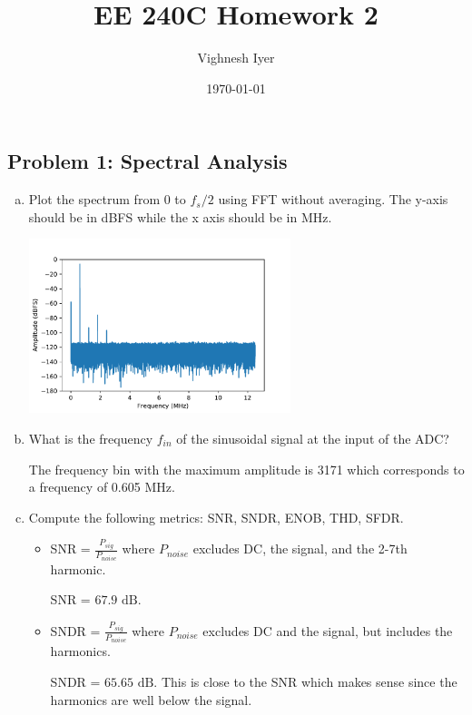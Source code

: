 \documentclass[11pt]{article}
\begin{document}
\title{EE 240C Homework 2}
\author{Vighnesh Iyer}
\date{\today}
\maketitle

\subsection*{Problem 1: Spectral Analysis}
\begin{enumerate}[a)]
    \item Plot the spectrum from 0 to $f_s/2$ using FFT without averaging. The y-axis should be in dBFS while the x axis should be in MHz.

      \begin{center}
        \includegraphics[width=0.6\textwidth]{figs/problem1a.pdf}
      \end{center}

    \item What is the frequency $f_{in}$ of the sinusoidal signal at the input of the ADC?

      The frequency bin with the maximum amplitude is 3171 which corresponds to a frequency of 0.605 MHz.

    \item Compute the following metrics: SNR, SNDR, ENOB, THD, SFDR.

      \begin{itemize}
        \item SNR = $\frac{P_{sig}}{P_{noise}}$ where $P_{noise}$ excludes DC, the signal, and the 2-7th harmonic.

        SNR = $67.9 \text{ dB}$.

        \item SNDR = $\frac{P_{sig}}{P_{noise}}$ where $P_{noise}$ excludes DC and the signal, but includes the harmonics.

          SNDR = $65.65 \text{ dB}$. This is close to the SNR which makes sense since the harmonics are well below the signal.


\end{itemize}
\end{enumerate}
\end{document}
